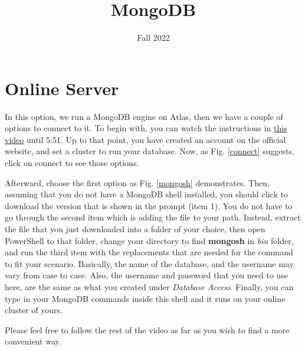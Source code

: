 \documentclass{homework}
\author{}
\date{Fall 2022}
\title{MongoDB}
\begin{document}
 \maketitle

\section*{Online Server}
In this option, we run a MongoDB engine on Atlas, then we have a couple of options to connect to it. To begin with, you can watch the instructions in \href{https://youtu.be/2QQGWYe7IDU?t=224}{this video} until 5:51. Up to that point, you have created an account on the official website, and set a cluster to run your database. Now, as Fig. \ref{connect} suggests, click on connect to see those options.

Afterward, choose the first option as Fig. \ref{mongosh} demonstrates. Then, assuming that you do not have a MongoDB shell installed, you should click to download the version that is shown in the prompt (item 1). You do not have to go through the second item which is adding the file to your path. Instead, extract the file that you just downloaded into a folder of your choice, then open PowerShell to that folder, change your directory to find \textbf{mongosh} in \textit{bin} folder, and run the third item with the replacements that are needed for the command to fit your scenario. Basically, the name of the database, and the username may vary from case to case. Also, the username and password that you need to use here, are the same as what you created under \textit{Database Access}.
Finally, you can type in your MongoDB commands inside this shell and it runs on your online cluster of yours.

Please feel free to follow the rest of the video as far as you wish to find a more convenient way.

\newpage
\end{document}
